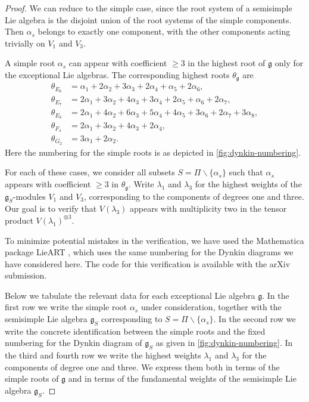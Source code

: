 \documentclass[a4paper, 12pt, reqno, english]{amsart}
\numberwithin{equation}{section}
\numberwithin{figure}{section}
\theoremstyle{plain}
\theoremstyle{plain}
\theoremstyle{plain}
\theoremstyle{plain}
\theoremstyle{plain}
\theoremstyle{definition}
\theoremstyle{definition}
\theoremstyle{definition}
\theoremstyle{remark}
\theoremstyle{definition}
\theoremstyle{definition}
\newcommand{\lieg}{\mathfrak{g}}
\newcommand{\simpleroots}{\Pi}
\begin{document}
\begin{proof}
We can reduce to the simple case, since the root system of a semisimple Lie algebra is the disjoint union of the root systems of the simple components. Then $\alpha_s$ belongs to exactly one component, with the other components acting trivially on $V_1$ and $V_3$.

A simple root $\alpha_s$ can appear with coefficient $\geq 3$ in the highest root of $\lieg$ only for the exceptional Lie algebras.
The corresponding highest roots $\theta_\lieg$ are
\[
\begin{split}
\theta_{E_6} & = \alpha_1 + 2 \alpha_2 + 3 \alpha_3 + 2 \alpha_4 + \alpha_5 + 2 \alpha_6, \\
\theta_{E_7} & = 2 \alpha_1 + 3 \alpha_2 + 4 \alpha_3 + 3 \alpha_4 + 2 \alpha_5 + \alpha_6 + 2 \alpha_7, \\
\theta_{E_8} & = 2 \alpha_1 + 4 \alpha_2 + 6 \alpha_3 + 5 \alpha_4 + 4 \alpha_5 + 3 \alpha_6 + 2 \alpha_7 + 3 \alpha_8, \\
\theta_{F_4} & = 2 \alpha_1 + 3 \alpha_2 + 4 \alpha_3 + 2 \alpha_4, \\
\theta_{G_2} & = 3 \alpha_1 + 2 \alpha_2.
\end{split}
\]
Here the numbering for the simple roots is as depicted in \cref{fig:dynkin-numbering}.

For each of these cases, we consider all subsets $S = \simpleroots \backslash \{\alpha_s\}$ such that $\alpha_s$ appears with coefficient $\geq 3$ in $\theta_\lieg$.
Write $\lambda_1$ and $\lambda_3$ for the highest weights of the $\lieg_S$-modules $V_1$ and $V_3$, corresponding to the components of degrees one and three.
Our goal is to verify that $V(\lambda_3)$ appears with multiplicity two in the tensor product $V(\lambda_1)^{\otimes 3}$.

To minimize potential mistakes in the verification, we have used the Mathematica package LieART \cite{lieart}, which uses the same numbering for the Dynkin diagrams we have considered here.
The code for this verification is available with the arXiv submission.

Below we tabulate the relevant data for each exceptional Lie algebra $\lieg$.
In the first row we write the simple root $\alpha_s$ under consideration, together with the semisimple Lie algebra $\lieg_S$ corresponding to $S = \simpleroots \backslash \{\alpha_s\}$.
In the second row we write the concrete identification between the simple roots and the fixed numbering for the Dynkin diagram of $\lieg_S$ as given in \cref{fig:dynkin-numbering}.
In the third and fourth row we write the highest weights $\lambda_1$ and $\lambda_3$ for the components of degree one and three.
We express them both in terms of the simple roots of $\lieg$ and in terms of the fundamental weights of the semisimple Lie algebra $\lieg_S$.


\end{proof}
\end{document}
